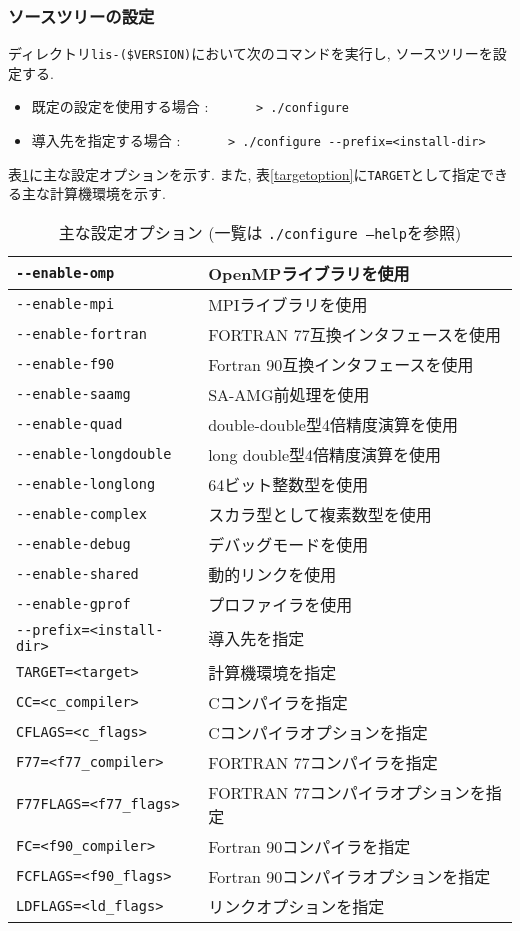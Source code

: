 \documentclass[a4paper]{jarticle}
\begin{document}
\subsubsection{ソースツリーの設定}
ディレクトリ{\tt lis-(\$VERSION)}において次のコマンドを実行し, ソースツリーを設定する. 
\begin{itemize}
\item 既定の設定を使用する場合 : \verb&      > ./configure&
\item 導入先を指定する場合 :   \verb&      > ./configure --prefix=<install-dir>&
\end{itemize}
表\ref{configoption}に主な設定オプションを示す. 
また, 表\ref{targetoption}に\verb+TARGET+として指定できる主な計算機環境を示す. 
\begin{table}[htbp]
\caption{主な設定オプション (一覧は {\tt ./configure --help}を参照) }
\label{configoption}
\begin{center}
\begin{tabular}{|l|l|}
\hline
\verb+--enable-omp+      & OpenMPライブラリを使用\\ \hline
\verb+--enable-mpi+      & MPIライブラリを使用\\ \hline
\verb+--enable-fortran+  & FORTRAN 77互換インタフェースを使用\\ \hline
\verb+--enable-f90    +  & Fortran 90互換インタフェースを使用\\ \hline
\verb+--enable-saamg+    & SA-AMG前処理を使用\\ \hline
\verb+--enable-quad+     & double-double型4倍精度演算を使用\\ \hline
\verb+--enable-longdouble+ & long double型4倍精度演算を使用\\ \hline
\verb+--enable-longlong+ & 64ビット整数型を使用\\ \hline
\verb+--enable-complex+  & スカラ型として複素数型を使用\\ \hline
\verb+--enable-debug+    & デバッグモードを使用\\ \hline
\verb+--enable-shared+   & 動的リンクを使用\\ \hline
\verb+--enable-gprof+    & プロファイラを使用\\ \hline
\verb+--prefix=<install-dir>+    & 導入先を指定\\ \hline
\verb+TARGET=<target>+    & 計算機環境を指定\\ \hline
\verb+CC=<c_compiler>+    & Cコンパイラを指定\\ \hline
\verb+CFLAGS=<c_flags>+    & Cコンパイラオプションを指定\\ \hline
\verb+F77=<f77_compiler>+    & FORTRAN 77コンパイラを指定\\ \hline
\verb+F77FLAGS=<f77_flags>+    & FORTRAN 77コンパイラオプションを指定\\ \hline
\verb+FC=<f90_compiler>+    & Fortran 90コンパイラを指定\\ \hline
\verb+FCFLAGS=<f90_flags>+    & Fortran 90コンパイラオプションを指定\\ \hline
\verb+LDFLAGS=<ld_flags>+    & リンクオプションを指定\\ \hline
\end{tabular}
\end{center}
\end{table}
\end{document}

